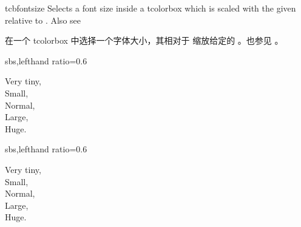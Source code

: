 \begin{docCommand}{tcbfontsize}{}
Selects a font size inside a tcolorbox which is scaled with the given
 relative to .
Also see 

在一个 tcolorbox 中选择一个字体大小，其相对于  缩放给定的 。也参见 。
\begin{dispExample*}{sbs,lefthand ratio=0.6}
\begin{tcolorbox}[fit basedim=10pt]
  { Very tiny,}\\
  { Small,}\\
  { Normal,}\\
  { Large,}\\
  { Huge.}
\end{tcolorbox}
\end{dispExample*}
\begin{dispExample*}{sbs,lefthand ratio=0.6}
\begin{tcolorbox}[fit basedim=10pt,
    fit to height=2cm]
  { Very tiny,}\\
  { Small,}\\
  { Normal,}\\
  { Large,}\\
  { Huge.}
\end{tcolorbox}
\end{dispExample*}
\end{docCommand}
